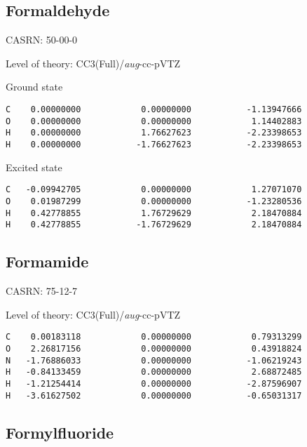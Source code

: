 \documentclass[journal=jctcce,manuscript=article,layout=traditional]{achemso}
\newcommand{\AVTZ}{\emph{aug}-cc-pVTZ}
\begin{document}
\subsection{Formaldehyde}

CASRN: 50-00-0

\begin{singlespace}
\noindent Level of theory: CC3(Full)/{\AVTZ}
\end{singlespace}

\begin{singlespace}
\noindent Ground state
\begin{verbatim}
C    0.00000000            0.00000000           -1.13947666
O    0.00000000            0.00000000            1.14402883
H    0.00000000            1.76627623           -2.23398653
H    0.00000000           -1.76627623           -2.23398653
\end{verbatim}
\end{singlespace}

\begin{singlespace}
\noindent Excited state
\begin{verbatim}
C   -0.09942705            0.00000000            1.27071070
O    0.01987299            0.00000000           -1.23280536
H    0.42778855            1.76729629            2.18470884
H    0.42778855           -1.76729629            2.18470884
\end{verbatim}
\end{singlespace}

\subsection{Formamide}

CASRN: 75-12-7

\begin{singlespace}
\noindent  Level of theory: CC3(Full)/{\AVTZ}
\begin{verbatim}
C    0.00183118            0.00000000            0.79313299
O    2.26817156            0.00000000            0.43918824
N   -1.76886033            0.00000000           -1.06219243
H   -0.84133459            0.00000000            2.68872485
H   -1.21254414            0.00000000           -2.87596907
H   -3.61627502            0.00000000           -0.65031317
\end{verbatim}
\end{singlespace}

\subsection{Formylfluoride}
\end{document}
